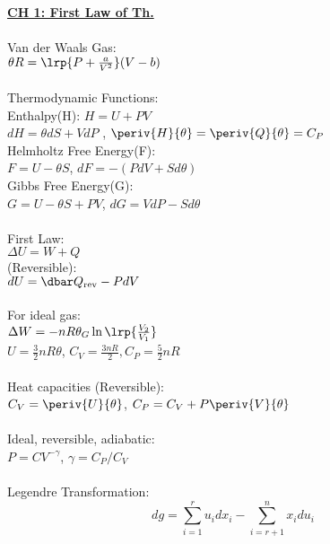 
\setlength{\columnseprule}{0.5pt}

\begin{multicols}{3}

\underline{\textbf{CH 1: First Law of Th.}}\\ \\
Van der Waals Gas: \\ $\theta R = \lrp{P + \frac{a}{V^2}}(V-b)$ \\ \\
Thermodynamic Functions:\\
Enthalpy(H): $H = U + PV$ \\$dH=\theta dS+VdP$ , $\periv{H}{\theta} =\periv{Q}{\theta} = C_P$ \\
Helmholtz Free Energy(F):\\ $F=U-\theta S$, $dF =-(PdV+Sd\theta)$\\
Gibbs Free Energy(G):\\ $G=U-\theta S+PV$, $dG = VdP-Sd\theta$ \\ \\
First Law: \\ $\Delta U = W+Q$ \\
(Reversible): \\ $dU = \dbar Q_{\text{rev}} -PdV$ \\ \\
For ideal gas: \\ $\Delta W = -nR\theta_G\ln\lrp{\frac{V_2}{V_1}}$ \\ $U=\frac{3}{2}nR\theta$, $C_V = \frac{3nR}{2}, C_P = \frac{5}{2}nR$   \\ \\ 
Heat capacities (Reversible): \\
$C_V = \periv{U}{\theta}$, $C_P = C_V+P\periv{V}{\theta}$ \\ \\
Ideal, reversible, adiabatic:\\
$P = CV^{-\gamma}$, $\gamma = C_P/C_V$ \\ \\
Legendre Transformation: 
\begin{equation*}
            dg = \sum_{i=1}^ru_idx_i-\sum_{i=r+1}^nx_idu_i
\end{equation*}

\columnbreak


\end{multicols}
